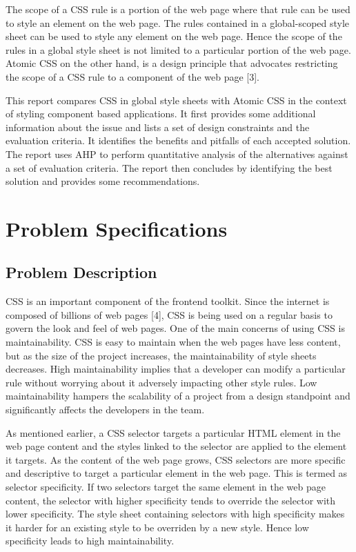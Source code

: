 \documentclass[12pt]{article}
\begin{document}
\vspace{0.5cm}

The scope of a CSS rule is a portion of the web page where that rule can be used to style an element on the web page. The rules contained in a global-scoped style sheet can be used to style any element on the web page. Hence the scope of the rules in a global style sheet is not limited to a particular portion of the web page. Atomic CSS on the other hand, is a design principle that advocates restricting the scope of a CSS rule to a component of the web page [3].

This report compares CSS in global style sheets with Atomic CSS in the context of styling component based applications. It first provides some additional information about the issue and lists a set of design constraints and the evaluation criteria. It identifies the benefits and pitfalls of each accepted solution. The report uses AHP to perform quantitative analysis of the alternatives against a set of evaluation criteria. The report then concludes by identifying the best solution and provides some recommendations.

\newpage

\section{Problem Specifications}
\subsection{Problem Description}
CSS is an important component of the frontend toolkit. Since the internet is composed of billions of web pages [4], CSS is being used on a regular basis to govern the look and feel of web pages. One of the main concerns of using CSS is maintainability. CSS is easy to maintain when the web pages have less content, but as the size of the project increases, the maintainability of style sheets decreases. High maintainability implies that a developer can modify a particular rule without worrying about it adversely impacting other style rules. Low maintainability hampers the scalability of a project from a design standpoint and significantly affects the developers in the team.

As mentioned earlier, a CSS selector targets a particular HTML element in the web page content and the styles linked to the selector are applied to the element it targets. As the content of the web page grows, CSS selectors are more specific and descriptive to target a particular element in the web page. This is termed as selector specificity. If two selectors target the same element in the web page content, the selector with higher specificity tends to override the selector with lower specificity. The style sheet containing selectors with high specificity makes it harder for an existing style to be overriden by a new style. Hence low specificity leads to high maintainability.
\end{document}
